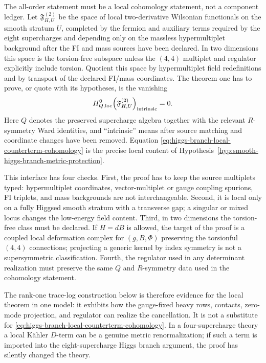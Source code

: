 \begin{construction}
\label{constr:higgs-branch-ward-counterterm-interface}
The all-order statement must be a local cohomology statement, not a component
ledger.  Let \({\mathfrak F}^{(2)}_{H,U}\) be the space of local
two-derivative Wilsonian functionals on the smooth stratum \(U\), completed by
the fermion and auxiliary terms required by the eight supercharges and
depending only on the massless hypermultiplet background after the FI and mass
sources have been declared.  In two dimensions this space is the torsion-free
subspace unless the \((4,4)\) multiplet and regulator explicitly include
torsion.  Quotient this space by hypermultiplet field redefinitions and by
transport of the declared FI/mass coordinates.  The theorem one has to prove,
or quote with its hypotheses, is the vanishing
\begin{equation}
  H^0_{Q,{\rm loc}}\!\left({\mathfrak F}^{(2)}_{H,U}\right)_{\rm intrinsic}
  =
  0 .
  \label{eq:higgs-branch-local-counterterm-cohomology}
\end{equation}
Here \(Q\) denotes the preserved supercharge algebra together with the relevant
\(R\)-symmetry Ward identities, and ``intrinsic'' means after source matching
and coordinate changes have been removed.  Equation
\eqref{eq:higgs-branch-local-counterterm-cohomology} is the precise local
content of Hypothesis~\ref{hyp:smooth-higgs-branch-metric-protection}.

This interface has four checks.  First, the proof has to keep the source
multiplets typed: hypermultiplet coordinates, vector-multiplet or gauge
coupling spurions, FI triplets, and mass backgrounds are not interchangeable.
Second, it is local only on a fully Higgsed smooth stratum with a transverse
gap; a singular or mixed locus changes the low-energy field content.  Third, in
two dimensions the torsion-free class must be declared.  If \(H=dB\) is allowed,
the target of the proof is a coupled local deformation complex for
\((g,B,\Phi)\) preserving the torsionful \((4,4)\) connections; projecting a
generic kernel by index symmetry is not a supersymmetric classification.
Fourth, the regulator used in any determinant realization must preserve the same
\(Q\) and \(R\)-symmetry data used in the cohomology statement.

The rank-one trace-log construction below is therefore evidence for the local
theorem in one model: it exhibits how the gauge-fixed heavy rows, contacts,
zero-mode projection, and regulator can realize the cancellation.  It is not a
substitute for \eqref{eq:higgs-branch-local-counterterm-cohomology}.  In a
four-supercharge theory a local K\"ahler \(D\)-term can be a genuine metric
renormalization; if such a term is imported into the eight-supercharge Higgs
branch argument, the proof has silently changed the theory.
\end{construction}

